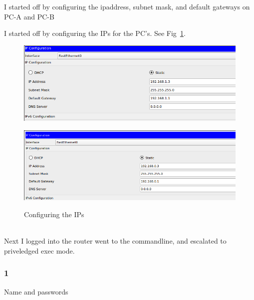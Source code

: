 \documentclass[../EngineeringJournal_CDavis.tex]{subfiles}
\begin{document}
I started off by configuring the ipaddress, subnet mask, and default gateways on PC-A and PC-B
\hfill\break

\noindent{}
I started off by configuring the IPs for the PC's. See Fig~\ref{config1}.

\begin{figure}[!hbt]
  \begin{minipage}[c]{0.4\linewidth}
    \centering
      \includegraphics[scale=0.24]{Figures/2020-01-28-093105_710x254_scrot.png}
      \label{config1PC-a}
  \end{minipage}\hfill
  \begin{minipage}[c]{0.4\linewidth}
    \centering
    \includegraphics[scale=0.24]{Figures/2020-01-28-093427_773x256_scrot.png}
    \label{config1PCb}
  \end{minipage}
  \caption{Configuring the IPs}\label{config1}
\end{figure}

\clearpage

\noindent{}
\\Next I logged into the router went to the commandline, and escalated to priveledged exec mode.

\hfill\break

\subsubsection{1}{Name and passwords}
\end{document}
